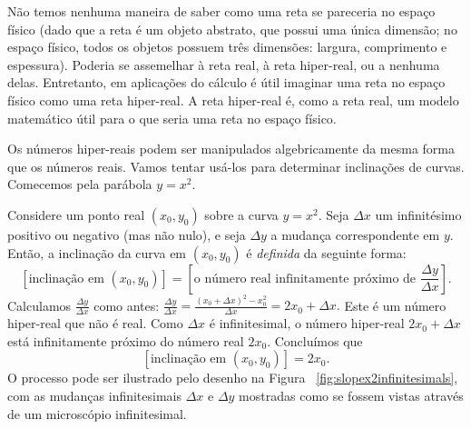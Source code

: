 
Não temos nenhuma maneira de saber como uma reta se pareceria no
espaço físico (dado que a reta é um objeto abstrato, que possui
uma única dimensão; no espaço físico, todos os objetos possuem
três dimensões: largura, comprimento e espessura). Poderia se
assemelhar à reta real, à reta hiper-real, ou a nenhuma delas.
Entretanto, em aplicações do cálculo é útil imaginar uma reta no
espaço físico como uma reta hiper-real. A reta hiper-real é,
como a reta real, um modelo matemático útil para o que seria
uma reta no espaço físico.

Os números hiper-reais podem ser manipulados algebricamente da
mesma forma que os números reais. Vamos tentar usá-los para
determinar inclinações de curvas. Comecemos pela parábola
$y = x^2$.

Considere um ponto real $(x_0, y_0)$ sobre a curva $y = x^2$.
Seja $\Delta x$ um infinitésimo positivo ou negativo (mas
não nulo), e seja $\Delta y$ a mudança correspondente em $y$.
Então, a inclinação da curva em $(x_0, y_0)$ é \emph{definida}
 da seguinte forma:
\[
  [\text{inclinação em } (x_0, y_0)] =
  \left[ \text{o número real infinitamente próximo de } \frac{\Delta y}{\Delta x} \right].
\]
Calculamos $\displaystyle \frac{\Delta y}{\Delta x}$ como antes:
$\displaystyle \frac{\Delta y}{\Delta x} =
\frac{(x_0 + \Delta x)^2 - x_0^2}{\Delta x} = 2x_0 + \Delta x.$
Este é um número hiper-real que não é real. Como $\Delta x$ é
infinitesimal, o número hiper-real $2x_0 + \Delta x$ está
infinitamente próximo do número real $2x_0$. Concluímos que
\[
  [\text{inclinação em } (x_0, y_0)] = 2x_0.
\]
O processo pode ser ilustrado pelo desenho na Figura~%
\ref{fig:slopex2infinitesimals}, com as mudanças
infinitesimais $\Delta x$ e $\Delta y$ mostradas como se
fossem vistas através de um microscópio infinitesimal.



